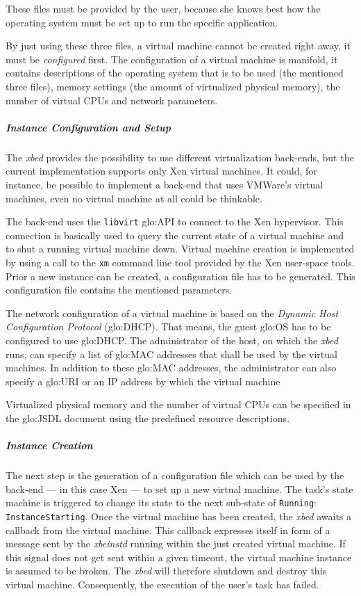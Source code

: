 These files must  be provided by the user, because she  knows best how the
operating system must be set up to run the specific application.

By just using these three files, a virtual machine cannot be created right
away, it must be \emph{configured}  first.  The configuration of a virtual
machine is manifold, it contains descriptions of the operating system that
is to  be used (\ie the  mentioned three files), memory  settings (\ie the
amount of  virtualized physical  memory), the number  of virtual  CPUs and
network parameters.

\subparagraph{Instance Configuration and Setup}

The \emph{xbed}  provides the possibility to  use different virtualization
back-ends,  but  the  current  implementation supports  only  Xen  virtual
machines. It could, for instance, be possible to implement a back-end that
uses VMWare's  \cite{vmware} virtual machines, even no  virtual machine at
all could be thinkable.

The back-end uses  the \texttt{libvirt} \gls{glo:API} to connect
to  the Xen hypervisor.  This connection  is basically  used to  query the
current state of  a virtual machine and to shut  a running virtual machine
down.   Virtual machine creation  is implemented  by using  a call  to the
\texttt{xm} command line tool provided by the Xen user-space tools.  Prior
a  new  instance   can  be  created,  a  configuration   file  has  to  be
generated. This configuration file contains the mentioned parameters.

The  network  configuration   of  a  virtual  machine  is   based  on  the
\emph{Dynamic Host Configuration  Protocol} (\gls{glo:DHCP}).  That means,
the guest  \gls{glo:OS} has  to be configured  to use  \gls{glo:DHCP}. The
administrator of  the host, on which  the \emph{xbed} runs,  can specify a
list  of  \gls{glo:MAC}  addresses  that  shall be  used  by  the  virtual
machines. In addition to  these \gls{glo:MAC} addresses, the administrator
can also  specify a \gls{glo:URI}  or an IP  address by which  the virtual
machine

Virtualized  physical  memory  and  the  number of  virtual  CPUs  can  be
specified  in the  \gls{glo:JSDL} document  using the  predefined resource
descriptions.

\subparagraph{Instance Creation}

The next step is the generation  of a configuration file which can be used
by the back-end --- in this case  Xen --- to set up a new virtual machine.
The task's  state machine  is triggered  to change its  state to  the next
sub-state   of  \texttt{Running}:  \texttt{InstanceStarting}.    Once  the
virtual machine has  been created, the \emph{xbed} awaits  a callback from
the virtual machine.  This callback  expresses itself in form of a message
sent  by  the \emph{xbeinstd}  running  within  the  just created  virtual
machine.  If  this signal does  not get sent  within a given  timeout, the
virtual machine  instance is  assumed to be  broken. The  \emph{xbed} will
therefore shutdown  and destroy  this virtual machine.   Consequently, the
execution  of the  user's task  has  failed.

